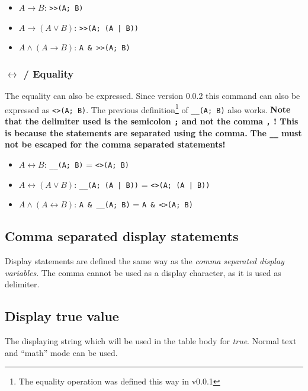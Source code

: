 \documentclass[a4paper]{article}
\begin{document}
\begin{itemize}
    \item $A \rightarrow B$:  \texttt{>>(A; B)}
    \item $A \rightarrow (A \lor B)$: \texttt{>>(A; (A | B))}
    \item $A \land (A \rightarrow B)$: \texttt{A \& >>(A; B)}
\end{itemize}

\subsubsection{\texorpdfstring{$\leftrightarrow$ / }{}Equality}

The equality can also be expressed. Since version 0.0.2 this command can also be expressed as \texttt{<>(A;~B)}. The previous definition\footnote{The equality operation was defined this way in v0.0.1} of \texttt{\_\_(A;~B)} also works. \textbf{Note that the delimiter used is the semicolon \texttt{;} and not the comma \texttt{,} ! This is because the statements are separated using the comma.} \textbf{The \texttt{\_\_} must not be escaped for the comma separated statements!}

\begin{itemize}
    \item $A \leftrightarrow B$:  \texttt{\_\_(A; B)} = \texttt{<>(A; B)}
    \item $A \leftrightarrow (A \lor B)$: \texttt{\_\_(A; (A | B))} = \texttt{<>(A; (A | B))}
    \item $A \land (A \leftrightarrow B)$: \texttt{A \& \_\_(A; B)} = \texttt{A \& <>(A; B)}
\end{itemize}

\subsection{Comma separated display statements}

Display statements are defined the same way as the \emph{comma separated display variables}. The comma cannot be used as a display character, as it is used as delimiter.

\subsection{Display true value}

The displaying string which will be used in the table body for \emph{true}. Normal text and ``math'' mode can be used.
\end{document}
